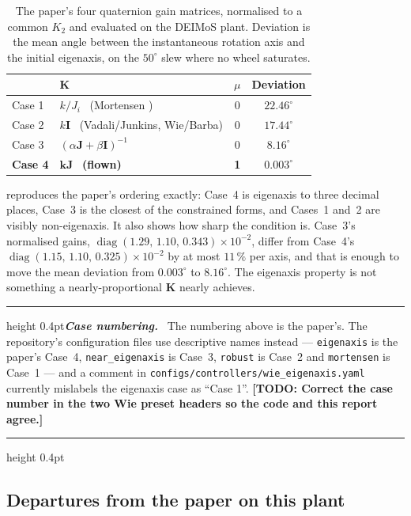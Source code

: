 \documentclass[conference,10pt,a4paper]{IEEEtran}
\newcommand{\remarkrule}{\par\nobreak\vspace{2pt}%
  \hrule height 0.4pt\vspace{4pt}\nobreak}
\newenvironment{cautionbox}[1][Caveat]
  {\par\medskip\remarkrule\noindent\small\textbf{\textit{#1.}}\ \ignorespaces}
  {\par\vspace{3pt}\hrule height 0.4pt\par\medskip\ignorespacesafterend}
\newcommand{\TODO}[1]{\textbf{[TODO: #1]}}
\newcommand{\TODO}[1]{}
\newcommand{\mat}[1]{\bm{#1}}
\DeclareMathOperator{\diag}{diag}
\begin{document}
\begin{table}[!t]
\centering
\caption{The paper's four quaternion gain matrices, normalised to a common
$K_2$ and evaluated on the DEIMoS plant. Deviation is the mean angle between
the instantaneous rotation axis and the initial eigenaxis, on the
$50^\circ$ slew where no wheel saturates.}
\label{tab:fourcases}
\footnotesize
\begin{tabular}{@{}llcc@{}}
\toprule
& $\mat{K}$ & $\mu$ & Deviation \\
\midrule
Case 1 & $k/J_i$ \ (Mortensen \cite{mortensen1968}) & 0 & $22.46^\circ$ \\
Case 2 & $k\mat{I}$ \ (Vadali/Junkins, Wie/Barba)   & 0 & $17.44^\circ$ \\
Case 3 & $(\alpha\mat{J}+\beta\mat{I})^{-1}$        & 0 & $8.16^\circ$ \\
\textbf{Case 4} & $\bm{k\mat{J}}$ \ \textbf{(flown)} & \textbf{1} & $\bm{0.003^\circ}$ \\
\bottomrule
\end{tabular}
\end{table}

 reproduces the paper's ordering exactly: Case~4 is
eigenaxis to three decimal places, Case~3 is the closest of the constrained
forms, and Cases~1 and~2 are visibly non-eigenaxis. It also shows how sharp the
condition is. Case~3's normalised gains,
$\diag(1.29,\,1.10,\,0.343)\times10^{-2}$, differ from Case~4's
$\diag(1.15,\,1.10,\,0.325)\times10^{-2}$ by at most $11\,\%$ per axis, and
that is enough to move the mean deviation from $0.003^\circ$ to $8.16^\circ$.
The eigenaxis property is not something a nearly-proportional $\mat{K}$
nearly achieves.

\begin{cautionbox}[Case numbering]
The numbering above is the paper's. The repository's configuration files use
descriptive names instead --- \texttt{eigenaxis} is the paper's Case~4,
\texttt{near\_eigenaxis} is Case~3, \texttt{robust} is Case~2 and
\texttt{mortensen} is Case~1 --- and a comment in
\texttt{configs/controllers/wie\_eigenaxis.yaml} currently mislabels the
eigenaxis case as ``Case 1''. \TODO{Correct the case number in the two Wie
preset headers so the code and this report agree.}
\end{cautionbox}

\subsection{Departures from the paper on this plant}
\label{sec:departures}
\end{document}
